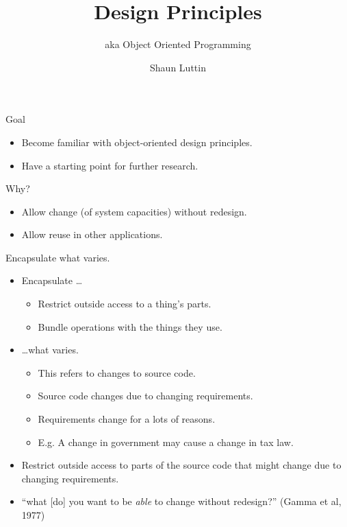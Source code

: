 \documentclass{beamer}
\title{Design Principles}
\subtitle{aka Object Oriented Programming}
\author{Shaun Luttin}
\begin{document}
\begin{frame}
  \titlepage
\end{frame}

\begin{frame}{Goal}

    \begin{itemize}
        \item Become familiar with object-oriented design principles.
        \item Have a starting point for further research.
    \end{itemize}

\end{frame}

\begin{frame}{Why?}

    \begin{itemize}
        \item Allow change (of system capacities) without redesign.
        \item Allow reuse in other applications.
    \end{itemize}

\end{frame}

\begin{frame}{Encapsulate what varies.}
    \begin{itemize}
        \item Encapsulate \ldots
            \begin{itemize}
                \item Restrict outside access to a thing's parts.
                \item Bundle operations with the things they use.
            \end{itemize}
        \item \ldots what varies.
            \begin{itemize}
                \item This refers to changes to source code.
                \item Source code changes due to changing requirements.
                \item Requirements change for a lots of reasons.
                \item E.g. A change in government may cause a change in tax law.
            \end{itemize}
        \item Restrict outside access to parts of the source code that might change due to changing requirements.
        \item ``what [do] you want to be \textit{able} to change without redesign?'' (Gamma et al, 1977)
    \end{itemize}
\end{frame}
\end{document}
